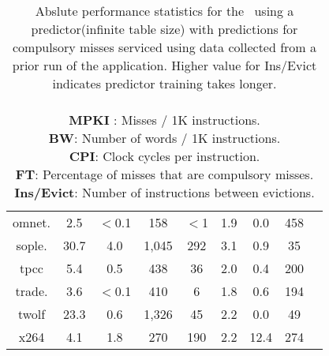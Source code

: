 \begin{table}[h]
\begin{tabular}{|c|c|c|c|c|c|c|c|c|}
	omnet.    &    2.5    &    $<$0.1  &    158    &    $<$1     &  1.9  & 0.0 &   458 \\
	sople.    &    30.7   &    4.0     &    1,045  &    292      &  3.1  & 0.9 &   35 \\
	tpcc      &    5.4    &    0.5     &    438    &    36       &  2.0  & 0.4 &   200 \\
	trade.    &    3.6    &    $<$0.1  &    410    &    6        &  1.8  & 0.6 &   194 \\
	twolf     &    23.3   &    0.6     &    1,326  &    45       &  2.2  & 0.0 &   49 \\
	x264      &    4.1    &    1.8     &    270    &    190      &  2.2  & 12.4 &  274 \\
	\hline                                  
	\end{tabular}                                                                       
                                                                       
\caption[Absolute performance statistics]{Abslute performance statistics for the \AC\ using a  predictor(infinite table size) with predictions for compulsory misses serviced using data collected from a prior run of the application. Higher value for Ins/Evict indicates predictor training takes longer. \\ \\
	\textbf{MPKI} : Misses / 1K instructions. \\
	\textbf{BW}: Number of words / 1K instructions. \\
	\textbf{CPI}: Clock cycles per instruction. \\
	\textbf{FT}: Percentage of misses that are compulsory misses.  \\
	\textbf{Ins/Evict}: Number of instructions between evictions. 
}
\label{table:Abs_Eval_Oracle}                                        
\end{table}                                                          
\clearpage





